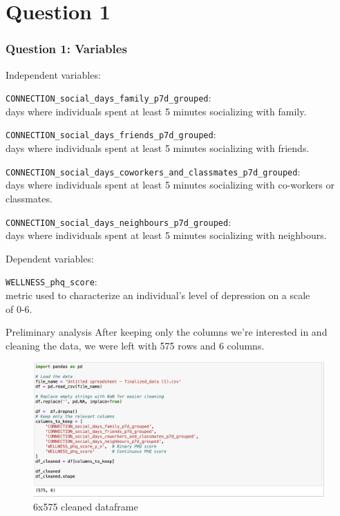 \documentclass{beamer}
\begin{document}
\section{Question 1}
\begin{frame}
\frametitle{Question 1: Variables}

Independent variables:

\vspace{1em}

{{\small{\tt CONNECTION\_social\_days\_family\_p7d\_grouped}:\\
days where individuals spent at least 5 minutes socializing with family.}

\vspace{0.5em}

{\small{\tt CONNECTION\_social\_days\_friends\_p7d\_grouped}:\\
days where individuals spent at least 5 minutes socializing with friends.}

\vspace{0.5em}

{\small{\tt CONNECTION\_social\_days\_coworkers\_and\_classmates\_p7d\_grouped}:\\
days where individuals spent at least 5 minutes socializing with co-workers or classmates.}

\vspace{0.5em}

{\small{\tt CONNECTION\_social\_days\_neighbours\_p7d\_grouped}:\\
days where individuals spent at least 5 minutes socializing with neighbours.}}

\vspace{1.5em}

Dependent variables:

{\small{\tt WELLNESS\_phq\_score}:\\
metric used to characterize an individual's level of depression on a scale\\
of 0-6.}


\end{frame}


\begin{frame}{Preliminary analysis}
    After keeping only the columns we're interested in and cleaning the data, we were left with 575 rows and 6 columns.
\begin{figure}
    \centering
    \includegraphics[width=1\linewidth]{image.png}
    \caption{6x575 cleaned dataframe}
    \label{fig:enter-label}
\end{figure}
\end{frame}
\end{document}
